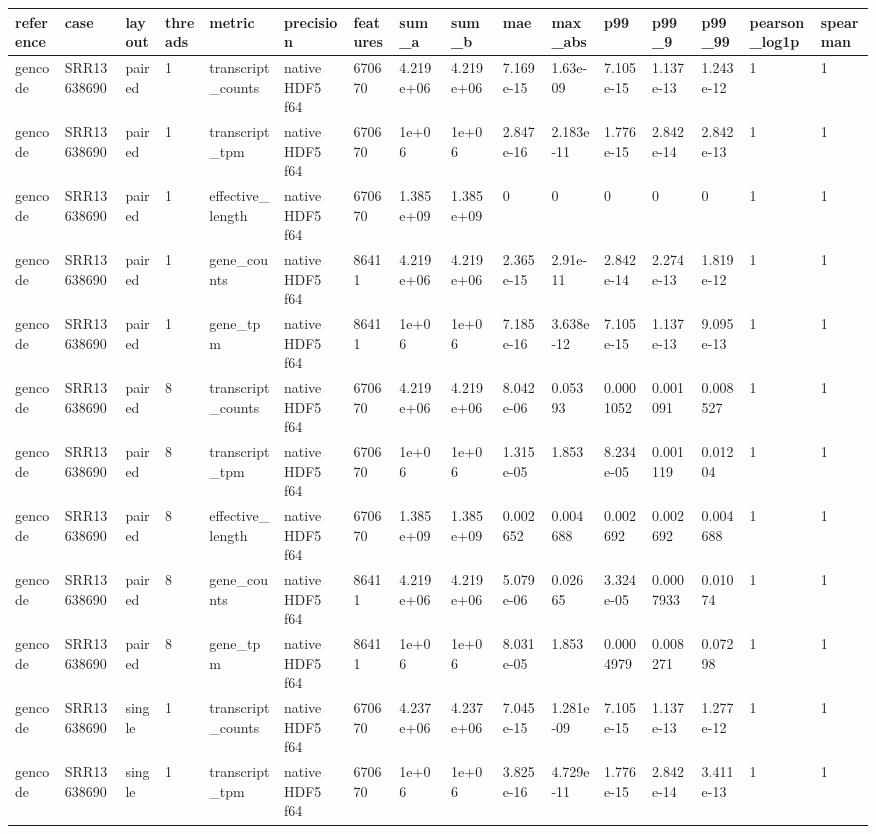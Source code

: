 \begin{tabular}{llllllllllllllll}
\toprule
reference & case & layout & threads & metric & precision & features & sum\_a & sum\_b & mae & max\_abs & p99 & p99\_9 & p99\_99 & pearson\_log1p & spearman \\
\midrule
gencode & SRR13638690 & paired & 1 & transcript\_counts & native HDF5 f64 & 670670 & 4.219e+06 & 4.219e+06 & 7.169e-15 & 1.63e-09 & 7.105e-15 & 1.137e-13 & 1.243e-12 & 1 & 1 \\
gencode & SRR13638690 & paired & 1 & transcript\_tpm & native HDF5 f64 & 670670 & 1e+06 & 1e+06 & 2.847e-16 & 2.183e-11 & 1.776e-15 & 2.842e-14 & 2.842e-13 & 1 & 1 \\
gencode & SRR13638690 & paired & 1 & effective\_length & native HDF5 f64 & 670670 & 1.385e+09 & 1.385e+09 & 0 & 0 & 0 & 0 & 0 & 1 & 1 \\
gencode & SRR13638690 & paired & 1 & gene\_counts & native HDF5 f64 & 86411 & 4.219e+06 & 4.219e+06 & 2.365e-15 & 2.91e-11 & 2.842e-14 & 2.274e-13 & 1.819e-12 & 1 & 1 \\
gencode & SRR13638690 & paired & 1 & gene\_tpm & native HDF5 f64 & 86411 & 1e+06 & 1e+06 & 7.185e-16 & 3.638e-12 & 7.105e-15 & 1.137e-13 & 9.095e-13 & 1 & 1 \\
gencode & SRR13638690 & paired & 8 & transcript\_counts & native HDF5 f64 & 670670 & 4.219e+06 & 4.219e+06 & 8.042e-06 & 0.05393 & 0.0001052 & 0.001091 & 0.008527 & 1 & 1 \\
gencode & SRR13638690 & paired & 8 & transcript\_tpm & native HDF5 f64 & 670670 & 1e+06 & 1e+06 & 1.315e-05 & 1.853 & 8.234e-05 & 0.001119 & 0.01204 & 1 & 1 \\
gencode & SRR13638690 & paired & 8 & effective\_length & native HDF5 f64 & 670670 & 1.385e+09 & 1.385e+09 & 0.002652 & 0.004688 & 0.002692 & 0.002692 & 0.004688 & 1 & 1 \\
gencode & SRR13638690 & paired & 8 & gene\_counts & native HDF5 f64 & 86411 & 4.219e+06 & 4.219e+06 & 5.079e-06 & 0.02665 & 3.324e-05 & 0.0007933 & 0.01074 & 1 & 1 \\
gencode & SRR13638690 & paired & 8 & gene\_tpm & native HDF5 f64 & 86411 & 1e+06 & 1e+06 & 8.031e-05 & 1.853 & 0.0004979 & 0.008271 & 0.07298 & 1 & 1 \\
gencode & SRR13638690 & single & 1 & transcript\_counts & native HDF5 f64 & 670670 & 4.237e+06 & 4.237e+06 & 7.045e-15 & 1.281e-09 & 7.105e-15 & 1.137e-13 & 1.277e-12 & 1 & 1 \\
gencode & SRR13638690 & single & 1 & transcript\_tpm & native HDF5 f64 & 670670 & 1e+06 & 1e+06 & 3.825e-16 & 4.729e-11 & 1.776e-15 & 2.842e-14 & 3.411e-13 & 1 & 1 \\

\end{tabular}
